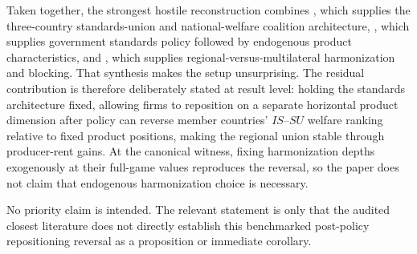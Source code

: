 Taken together, the strongest hostile reconstruction combines \citet{GandalShy2001}, which supplies the three-country standards-union and national-welfare coalition architecture, \citet{Ruiz2004}, which supplies government standards policy followed by endogenous product characteristics, and \citet{TakaradaEtAl2020}, which supplies regional-versus-multilateral harmonization and blocking. That synthesis makes the setup unsurprising. The residual contribution is therefore deliberately stated at result level: holding the standards architecture fixed, allowing firms to reposition on a separate horizontal product dimension after policy can reverse member countries' $IS$--$SU$ welfare ranking relative to fixed product positions, making the regional union stable through producer-rent gains. At the canonical witness, fixing harmonization depths exogenously at their full-game values reproduces the reversal, so the paper does not claim that endogenous harmonization choice is necessary.

No priority claim is intended. The relevant statement is only that the audited closest literature does not directly establish this benchmarked post-policy repositioning reversal as a proposition or immediate corollary.